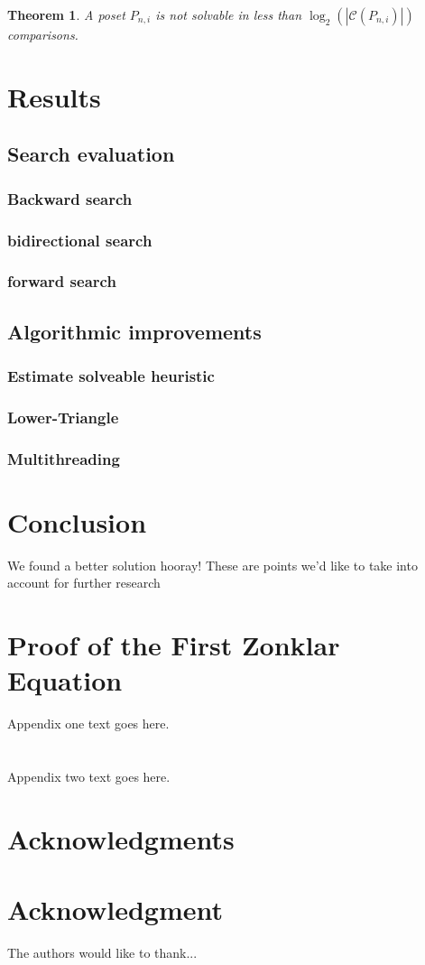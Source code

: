 \documentclass[10pt,journal,compsoc]{IEEEtran}
\newtheorem{theorem}{Theorem}
\begin{document}
\begin{theorem}
  A poset $P_{n,i}$ is not solvable in less than $\log_2(|\mathcal{C}(P_{n,i})|)$ comparisons.


\end{theorem}

\section{Results}
\subsection{Search evaluation}
\subsubsection{Backward search}
\subsubsection{bidirectional search}
\subsubsection{forward search}

\subsection{Algorithmic improvements}
\subsubsection{Estimate solveable heuristic}
\subsubsection{Lower-Triangle}
\subsubsection{Multithreading}

\section{Conclusion}
We found a better solution hooray!
These are points we'd like to take into account for further research


\appendices
\section{Proof of the First Zonklar Equation}
Appendix one text goes here.
\section{}
Appendix two text goes here.


\ifCLASSOPTIONcompsoc
  \section*{Acknowledgments}
\else
  \section*{Acknowledgment}
\fi


The authors would like to thank...

\ifCLASSOPTIONcaptionsoff
  \newpage
\fi




\end{document}
